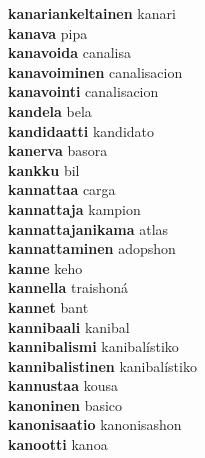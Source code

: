 \textbf{kanariankeltainen } kanari \\
\textbf{kanava } pipa \\
\textbf{kanavoida } canalisa \\
\textbf{kanavoiminen } canalisacion \\
\textbf{kanavointi } canalisacion \\
\textbf{kandela } bela \\
\textbf{kandidaatti } kandidato \\
\textbf{kanerva } basora \\
\textbf{kankku } bil \\
\textbf{kannattaa } carga \\
\textbf{kannattaja } kampion \\
\textbf{kannattajanikama } atlas \\
\textbf{kannattaminen } adopshon \\
\textbf{kanne } keho \\
\textbf{kannella } traishoná \\
\textbf{kannet } bant \\
\textbf{kannibaali } kanibal \\
\textbf{kannibalismi } kanibalístiko \\
\textbf{kannibalistinen } kanibalístiko \\
\textbf{kannustaa } kousa \\
\textbf{kanoninen } basico \\
\textbf{kanonisaatio } kanonisashon \\
\textbf{kanootti } kanoa \\
